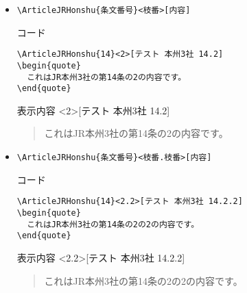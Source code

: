 \documentclass[oneside,10pt,a4paper]{jsarticle}
\begin{document}
\begin{itemize}
\begin{itembox}[l]{表示内容}
      \end{itembox}
    \item \verb|\ArticleJRHonshu{条文番号}<枝番>[内容]|
      \begin{itembox}[l]{コード}
        {\footnotesize\begin{verbatim}
\ArticleJRHonshu{14}<2>[テスト 本州3社 14.2]
\begin{quote}
  これはJR本州3社の第14条の2の内容です。
\end{quote}\end{verbatim}}
      \end{itembox}
      \begin{itembox}[l]{表示内容}
        <2>[テスト 本州3社 14.2]
        \begin{quote}
          これはJR本州3社の第14条の2の内容です。
        \end{quote}
      \end{itembox}
    \item \verb|\ArticleJRHonshu{条文番号}<枝番.枝番>[内容]|
      \begin{itembox}[l]{コード}
        {\footnotesize\begin{verbatim}
\ArticleJRHonshu{14}<2.2>[テスト 本州3社 14.2.2]
\begin{quote}
  これはJR本州3社の第14条の2の2の内容です。
\end{quote}\end{verbatim}}
      \end{itembox}
      \begin{itembox}[l]{表示内容}
        <2.2>[テスト 本州3社 14.2.2]
        \begin{quote}
          これはJR本州3社の第14条の2の2の内容です。
        \end{quote}
      \end{itembox}
  \end{itemize}
\end{document}
